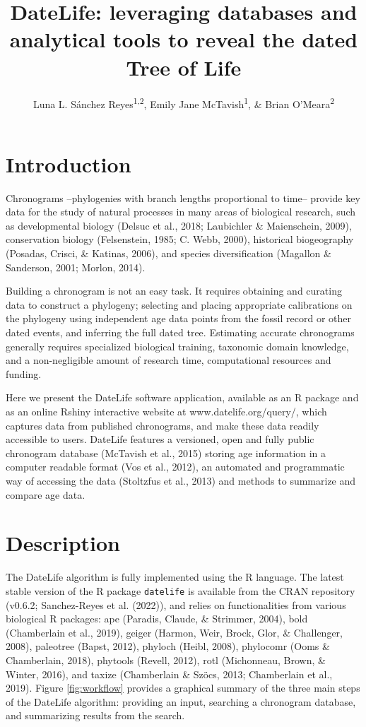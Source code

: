 \documentclass[
  english,
  man]{apa6}
\title{DateLife: leveraging databases and analytical tools to reveal the dated Tree of Life}
\author{Luna L. Sánchez Reyes\textsuperscript{1,2}, Emily Jane McTavish\textsuperscript{1}, \& Brian O'Meara\textsuperscript{2}}
\date{}
\affiliation{\vspace{0.5cm}\textsuperscript{1} University of California, Merced\\\textsuperscript{2} University of Tennessee, Knoxville}
\begin{document}
\maketitle

\hypertarget{introduction}{%
\section{Introduction}\label{introduction}}

Chronograms --phylogenies with branch lengths proportional to time-- provide key data for the study of natural processes in many areas of biological research, such as developmental biology (Delsuc et al., 2018; Laubichler \& Maienschein, 2009), conservation biology (Felsenstein, 1985; C. Webb, 2000), historical biogeography (Posadas, Crisci, \& Katinas, 2006), and species diversification (Magallon \& Sanderson, 2001; Morlon, 2014).

Building a chronogram is not an easy task.
It requires obtaining and curating data to construct a phylogeny; selecting and placing appropriate calibrations on the phylogeny using independent age data points from the fossil record or other dated events, and inferring the full dated tree.
Estimating accurate chronograms generally requires specialized biological training, taxonomic domain knowledge, and a non-negligible amount of research time, computational resources and funding.

Here we present the DateLife software application, available as an R package and as an online Rshiny interactive website at www.datelife.org/query/, which captures data from published chronograms, and make these data readily accessible to users.
DateLife features a versioned, open and fully public chronogram database (McTavish et al., 2015) storing age information in a computer readable format (Vos et al., 2012), an automated and programmatic way of accessing the data (Stoltzfus et al., 2013) and methods to summarize and compare age data.

\hypertarget{description}{%
\section{Description}\label{description}}

The DateLife algorithm is fully implemented using the R language. The latest stable version of the R package \texttt{datelife} is available from the CRAN repository (v0.6.2; Sanchez-Reyes et al. (2022)), and relies on functionalities from various biological R packages:
ape (Paradis, Claude, \& Strimmer, 2004),
bold (Chamberlain et al., 2019),
geiger (Harmon, Weir, Brock, Glor, \& Challenger, 2008),
paleotree (Bapst, 2012),
phyloch (Heibl, 2008),
phylocomr (Ooms \& Chamberlain, 2018),
phytools (Revell, 2012),
rotl (Michonneau, Brown, \& Winter, 2016), and
taxize (Chamberlain \& Szöcs, 2013; Chamberlain et al., 2019).
Figure \ref{fig:workflow} provides a graphical summary of the three main steps of the DateLife algorithm: providing an input, searching a chronogram database, and summarizing results from the search.
\end{document}
